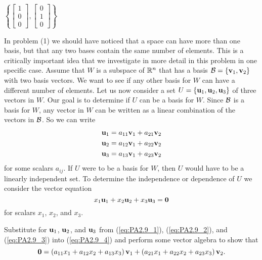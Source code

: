 \begin{pa}
	\item $\left\{\left[ \begin{array}{c} 1\\0\\0\end{array} \right],\left[ \begin{array}{c} 0\\1\\ 0\end{array} \right]\right\}$

	
	\ea

\item In problem (1) we should have noticed that a space can have more than one basis, but that any two bases contain the same number of elements. This is a critically important idea that we investigate in more detail in this problem in one specific case. Assume that $W$ is a subspace of $\mathbb{R}^n$ that has a basis $\mathcal{B} = \{\mathbf{v}_1, \mathbf{v}_2\}$ with two basis vectors. We want to see if any other basis for $W$ can have a different number of elements. Let us now consider a set $U = \{\mathbf{u}_1, \mathbf{u}_2, \mathbf{u}_3\}$ of three vectors in $W$. Our goal is to determine if $U$ can be a basis for $W$. Since $\mathcal{B}$ is a basis for $W$, any vector in $W$ can be written as a linear combination of the vectors in $\mathcal{B}$. So we can write
\begin{align}
\mathbf{u}_1 &= a_{11}\mathbf{v}_1 + a_{21}\mathbf{v}_2 \label{eq:PA2.9_1} \\
\mathbf{u}_2 &= a_{12}\mathbf{v}_1 + a_{22}\mathbf{v}_2 \label{eq:PA2.9_2} \\
\mathbf{u}_3 &= a_{13}\mathbf{v}_1 + a_{23}\mathbf{v}_2 \label{eq:PA2.9_3} 
\end{align}
for some scalars $a_{ij}$. If $U$ were to be a basis for $W$, then $U$ would have to be a linearly independent set. To determine the independence or dependence of $U$ we consider the vector equation 
\begin{equation} \label{eq:PA2.9_4}
x_1 \mathbf{u}_1 + x_2 \mathbf{u}_2 + x_3 \mathbf{u}_3 = \mathbf{0}
\end{equation}
for scalars $x_1$, $x_2$, and $x_3$. 

	\ba
	\item Substitute for $\mathbf{u}_1$, $\mathbf{u}_2$, and $\mathbf{u}_3$ from (\ref{eq:PA2.9_1}), (\ref{eq:PA2.9_2}), and (\ref{eq:PA2.9_3}) into (\ref{eq:PA2.9_4}) and perform some vector algebra to show that 
\begin{equation} \label{eq:PA2.9_5}
\mathbf{0} = \left(a_{11}x_1+a_{12}x_2 + a_{13}x_3\right) \mathbf{v}_1 + \left(a_{21}x_1+a_{22}x_2 + a_{23}x_3\right) \mathbf{v}_2.
\end{equation}



\end{pa}
